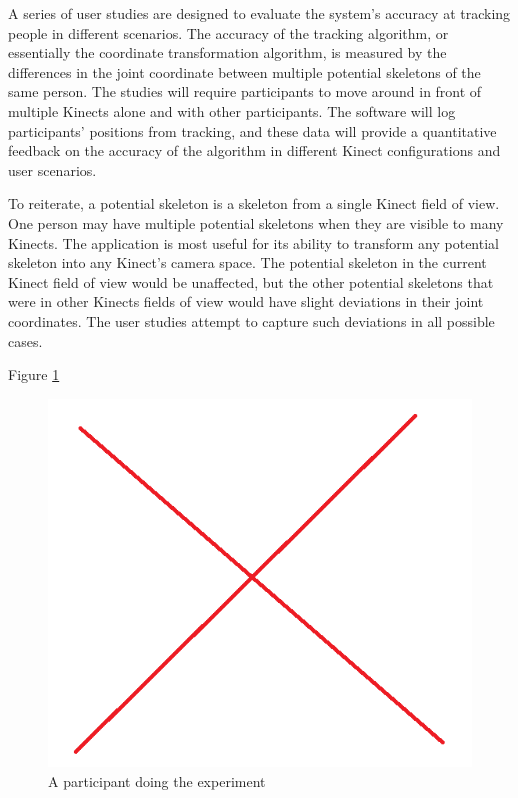 \documentclass{sigchi}
\begin{document}
A series of user studies are designed to evaluate the system's accuracy at tracking people in different scenarios. The accuracy of the tracking algorithm, or essentially the coordinate transformation algorithm, is measured by the differences in the joint coordinate between multiple potential skeletons of the same person. The studies will require participants to move around in front of multiple Kinects alone and with other participants. The software will log participants' positions from tracking, and these data will provide a quantitative feedback on the accuracy of the algorithm in different Kinect configurations and user scenarios.

To reiterate, a potential skeleton is a skeleton from a single Kinect field of view. One person may have multiple potential skeletons when they are visible to many Kinects. The application is most useful for its ability to transform any potential skeleton into any Kinect's camera space. The potential skeleton in the current Kinect field of view would be unaffected, but the other potential skeletons that were in other Kinects fields of view would have slight deviations in their joint coordinates. The user studies attempt to capture such deviations in all possible cases.

Figure \ref{fig:studies_example}

\begin{figure}[!h]
  \centering
  \includegraphics[width=0.9\columnwidth]{studies_example}
  \caption{A participant doing the experiment}
  \label{fig:studies_example}
\end{figure}
\end{document}
